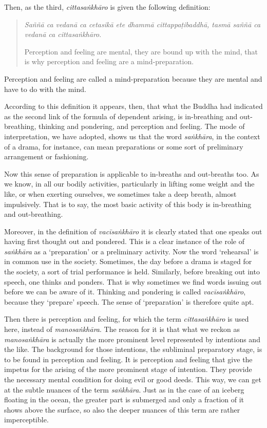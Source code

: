 Then, as the third, \emph{cittasaṅkhāro} is given the following definition:

\begin{quote}
\emph{Saññā ca vedanā ca cetasikā ete dhammā cittappaṭibaddhā, tasmā saññā ca vedanā ca cittasaṅkhāro}.

Perception and feeling are mental, they are bound up with the mind, that is why perception and feeling are a mind-preparation.
\end{quote}

Perception and feeling are called a mind-preparation because they are mental and have to do with the mind.

According to this definition it appears, then, that what the Buddha had indicated as the second link of the formula of dependent arising, is in-breathing and out-breathing, thinking and pondering, and perception and feeling. The mode of interpretation, we have adopted, shows us that the word \emph{saṅkhāra}, in the context of a drama, for instance, can mean preparations or some sort of preliminary arrangement or fashioning.

Now this sense of preparation is applicable to in-breaths and out-breaths too. As we know, in all our bodily activities, particularly in lifting some weight and the like, or when exerting ourselves, we sometimes take a deep breath, almost impulsively. That is to say, the most basic activity of this body is in-breathing and out-breathing.

Moreover, in the definition of \emph{vacīsaṅkhāro} it is clearly stated that one speaks out having first thought out and pondered. This is a clear instance of the role of \emph{saṅkhāra} as a `preparation' or a preliminary activity. Now the word `rehearsal' is in common use in the society. Sometimes, the day before a drama is staged for the society, a sort of trial performance is held. Similarly, before breaking out into speech, one thinks and ponders. That is why sometimes we find words issuing out before we can be aware of it. Thinking and pondering is called \emph{vacīsaṅkhāro}, because they `prepare' speech. The sense of `preparation' is therefore quite apt.

Then there is perception and feeling, for which the term \emph{cittasaṅkhāro} is used here, instead of \emph{manosaṅkhāra}. The reason for it is that what we reckon as \emph{manosaṅkhāra} is actually the more prominent level represented by intentions and the like. The background for those intentions, the subliminal preparatory stage, is to be found in perception and feeling. It is perception and feeling that give the impetus for the arising of the more prominent stage of intention. They provide the necessary mental condition for doing evil or good deeds. This way, we can get at the subtle nuances of the term \emph{saṅkhāra}. Just as in the case of an iceberg floating in the ocean, the greater part is submerged and only a fraction of it shows above the surface, so also the deeper nuances of this term are rather imperceptible.

